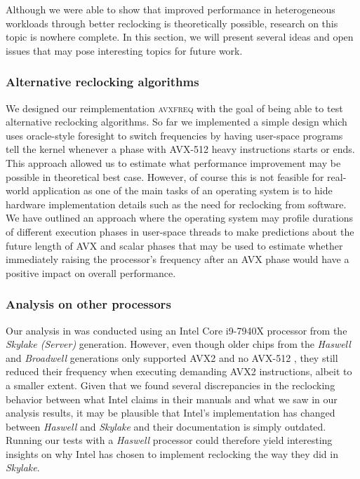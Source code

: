 Although we were able to show that improved performance in heterogeneous workloads through better reclocking is theoretically possible, research on this topic is nowhere complete. In this section, we will present several ideas and open issues that may pose interesting topics for future work.

\subsubsection{Alternative reclocking algorithms}
\label{sec:conclusion:futurework:algorithms}

We designed our reimplementation \textsc{avxfreq} with the goal of being able to test alternative reclocking algorithms. So far we implemented a simple design which uses oracle-style foresight to switch frequencies by having user-space programs tell the kernel whenever a phase with \gls{AVX-512} heavy instructions starts or ends. This approach allowed us to estimate what performance improvement may be possible in theoretical best case. However, of course this is not feasible for real-world application as one of the main tasks of an operating system is to hide hardware implementation details such as the need for reclocking from software. We have outlined an approach where the operating system may profile durations of different execution phases in user-space threads to make predictions about the future length of \gls{AVX} and scalar phases that may be used to estimate whether immediately raising the processor's frequency after an \gls{AVX} phase would have a positive impact on overall performance.

\subsubsection{Analysis on other processors}
\label{sec:conclusion:futurework:otherprocessors}

Our analysis in  was conducted using an Intel Core i9-7940X processor from the \textit{Skylake (Server)} generation. However, even though older chips from the \textit{Haswell} and \textit{Broadwell} generations only supported \gls{AVX2} and no \gls{AVX-512} \cite{intelhaswell} \cite{intelxeonscalabledeepdive}, they still reduced their frequency when executing demanding \gls{AVX2} instructions, albeit to a smaller extent. Given that we found several discrepancies in the reclocking behavior between what Intel claims in their manuals and what we saw in our analysis results, it may be plausible that Intel's implementation has changed between \textit{Haswell} and \textit{Skylake} and their documentation is simply outdated. Running our tests with a \textit{Haswell} processor could therefore yield interesting insights on why Intel has chosen to implement reclocking the way they did in \textit{Skylake}.

